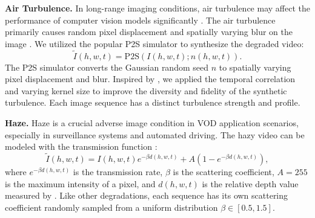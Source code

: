 \noindent \textbf{Air Turbulence.} In long-range imaging conditions, air turbulence may affect the performance of computer vision models significantly \cite{Liu_2024_WACV}. The air turbulence primarily causes random pixel displacement and spatially varying blur on the image \cite{chan2023computational}. We utilized the popular P2S simulator \cite{chimitt2020simulating, Mao_2021_ICCV} to synthesize the degraded video:
\begin{equation}
    \widetilde{I}(h,w,t) = \text{P2S}(I(h,w,t); n(h,w,t)).
\end{equation}
The P2S simulator converts the Gaussian random seed $n$ to spatially varying pixel displacement and blur. Inspired by \cite{chimitt2022real, zhang2022imaging}, we applied the temporal correlation and varying kernel size to improve the diversity and fidelity of the synthetic turbulence. Each image sequence has a distinct turbulence strength and profile.

\noindent \textbf{Haze.} Haze is a crucial adverse image condition in VOD application scenarios, especially in surveillance systems and automated driving. The hazy video can be modeled with the transmission function \cite{cai2016dehazenet}:
\begin{equation}
    \widetilde{I}(h,w,t) = I(h,w,t)e^{-\beta d(h,w,t)} + A(1-e^{-\beta d(h,w,t)} ),
\end{equation}
\noindent where $e^{-\beta d(h,w,t)}$ is the transmission rate, $\beta$ is the scattering coefficient, $A=255$ is the maximum intensity of a pixel, and $d(h,w,t)$ is the relative depth value measured by \cite{Godard_2019_mono}. Like other degradations, each sequence has its own scattering coefficient randomly sampled from a uniform distribution $\beta \in [0.5,1.5]$. 

